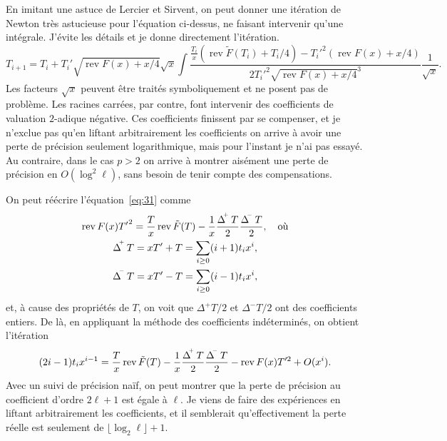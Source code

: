 \documentclass{article}
\DeclareMathOperator{\rev}{rev}
\DeclareMathOperator{\Dplus}{\Delta^{{}^{\kern-0.5ex +}}}
\DeclareMathOperator{\Dminus}{\Delta^{{}^{\kern-0.5ex -}}}
\begin{document}
En imitant une astuce de Lercier et Sirvent, on peut donner une
itération de Newton très astucieuse pour l'équation ci-dessus, ne
faisant intervenir qu'une intégrale. J'évite les détails et je donne
directement l'itération.
\begin{equation}
  \label{eq:41}
  T_{i+1} = T_i + T_i'\sqrt{\rev F(x) + x/4}\sqrt{x}
  \int \frac{\frac{T_i}{x}(\rev\tilde{F}(T_i) + T_i/4) - {T_i'}^2(\rev F(x) + x/4)}{2{T_i'}^2\sqrt{\rev F(x) + x/4}^3}
  \frac{1}{\sqrt{x}}.
\end{equation}
Les facteurs $\sqrt{x}$ peuvent être traités symboliquement et ne
posent pas de problème. Les racines carrées, par contre, font
intervenir des coefficients de valuation $2$-adique négative. Ces
coefficients finissent par se compenser, et je n'exclue pas qu'en
liftant arbitrairement les coefficients on arrive à avoir une perte de
précision seulement logarithmique, mais pour l'instant je n'ai pas
essayé. Au contraire, dans le cas $p>2$ on arrive à montrer aisément
une perte de précision en $O(\log^2\ell)$, sans besoin de tenir compte
des compensations.

On peut réécrire l'équation~\eqref{eq:31} comme
\begin{equation}
  \label{eq:32}
  \begin{gathered}
    \rev F(x){T'}^2 = \frac{T}{x}\rev\tilde{F}(T) - \frac{1}{x}\frac{\Dplus T}{2}\frac{\Dminus T}{2},
    \quad\text{où}\\
    \Dplus T = xT' + T = \sum_{i\ge0}(i+1)t_ix^i,\\
    \Dminus T = xT' - T = \sum_{i\ge0}(i-1)t_ix^i,
  \end{gathered}
\end{equation}
et, à cause des propriétés de $T$, on voit que $\Delta^+T/2$ et
$\Delta^-T/2$ ont des coefficients entiers. De là, en appliquant la
méthode des coefficients indéterminés, on obtient l'itération
\begin{equation}
  \label{eq:38}
  (2i-1)t_ix^{i-1} = 
  \frac{T}{x}\rev\Tilde{F}(T) - \frac{1}{x}\frac{\Dplus T}{2}\frac{\Dminus T}{2}
  - \rev F(x)T'^2 + O(x^i).
\end{equation}
Avec un suivi de précision naïf, on peut montrer que la perte de
précision au coefficient d'ordre $2\ell+1$ est égale à $\ell$. Je
viens de faire des expériences en liftant arbitrairement les
coefficients, et il semblerait qu'effectivement la perte réelle est
seulement de $\lfloor\log_2\ell\rfloor +1$.
\end{document}
